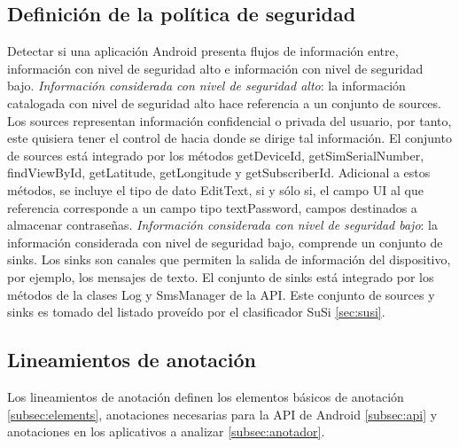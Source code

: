 \subsection{Definición de la política de seguridad}
Detectar si una aplicación Android presenta flujos de información entre,
información con nivel de seguridad alto e información con nivel de seguridad bajo.\newline
\textit{Información considerada con nivel de seguridad alto}: la información
catalogada con nivel de seguridad alto hace referencia a un conjunto de sources.
Los sources representan información confidencial o privada del usuario, por
tanto, este quisiera tener el control de hacia donde se dirige tal información.
El conjunto de sources está integrado por los métodos getDeviceId,
getSimSerialNumber, findViewById, getLatitude, getLongitude y getSubscriberId.
Adicional a estos métodos, se incluye el tipo de dato EditText, si y sólo si, el
campo UI al que referencia corresponde a un campo tipo textPassword, campos
destinados a almacenar contraseñas.\newline 
\textit{Información considerada con nivel de seguridad bajo}: la
información considerada con nivel de seguridad bajo, comprende un conjunto
de sinks. Los sinks son canales que permiten la salida de información del
dispositivo, por ejemplo, los mensajes de texto. El conjunto de sinks
está integrado por los métodos de la clases Log y SmsManager de la API.\newline
Este conjunto de sources y sinks es tomado del listado proveído por el
clasificador SuSi \ref{sec:susi}.

\subsection{Lineamientos de anotación}
Los lineamientos de anotación definen los elementos básicos de anotación
\ref{subsec:elements}, anotaciones necesarias para la API de Android
\ref{subsec:api} y anotaciones en los aplicativos a analizar \ref{subsec:anotador}.

